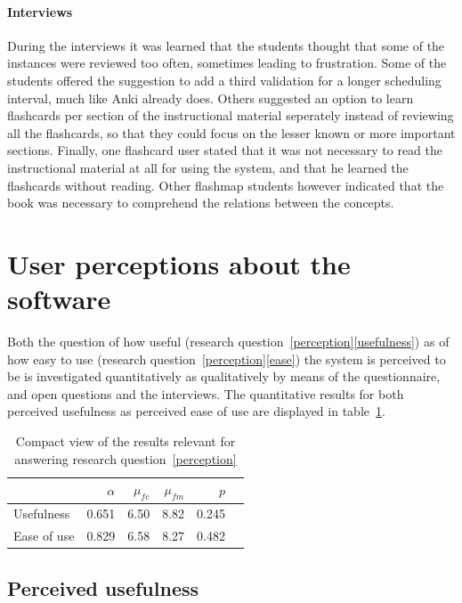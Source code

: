 \paragraph{Interviews} During the interviews it was learned that the students thought that some of the instances were reviewed too often, sometimes leading to frustration. Some of the students offered the suggestion to add a third validation for a longer scheduling interval, much like Anki already does. Others suggested an option to learn flashcards per section of the instructional material seperately instead of reviewing all the flashcards, so that they could focus on the lesser known or more important sections. Finally, one flashcard user stated that it was not necessary to read the instructional material at all for using the system, and that he learned the flashcards without reading. Other flashmap students however indicated that the book was necessary to comprehend the relations between the concepts.

\section{User perceptions about the software}

Both the question of how useful (research question~\ref{perception}\ref{usefulness}) as of how easy to use (research question~\ref{perception}\ref{ease}) the system is perceived to be is investigated quantitatively as qualitatively by means of the questionnaire, and open questions and the interviews. The quantitative results for both perceived usefulness as perceived ease of use are displayed in table~\ref{tab:perception}.

\begin{table}
    \centering
    \begin{tabular}{lrrrrr}
        \toprule
        & $\alpha$ & $\mu_{fc}$ & $\mu_{fm}$ & $p$ \\
        \midrule
        Usefulness & 0.651 & 6.50 & 8.82 & 0.245 \\
        Ease of use & 0.829 & 6.58 & 8.27 & 0.482 \\
        \bottomrule
    \end{tabular}
    \caption{Compact view of the results relevant for answering research question~\protect\ref{perception}}
    \label{tab:perception}
\end{table}

\subsection{Perceived usefulness}

